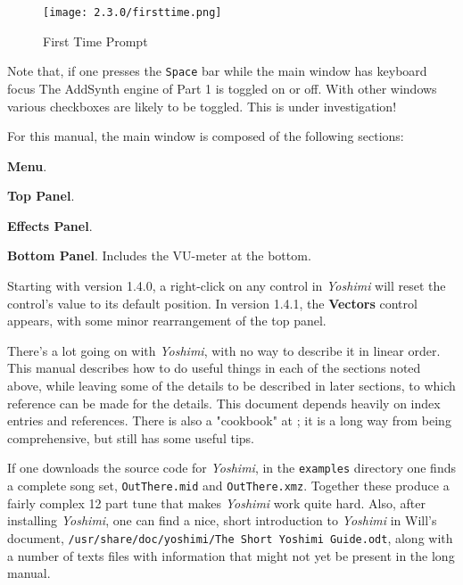 \documentclass[
 11pt,
 twoside,
 a4paper,
 final                                 %
]{article}
\begin{document}
\begin{figure}[H]
   \centering
   \texttt{[image: 2.3.0/firsttime.png]}
   \caption{First Time Prompt}
   \label{fig:first_time_info}
\end{figure}

   Note that, if one presses the \texttt{Space} bar while the main window has
   keyboard focus The AddSynth engine of Part 1 is toggled on or off. With other windows various checkboxes are likely to be toggled. This is under investigation!

   For this manual, the main window is composed of the following sections:

\begin{enumber}
   \item \textbf{Menu}.
   \item \textbf{Top Panel}.
   \item \textbf{Effects Panel}.
   \item \textbf{Bottom Panel}.  Includes the VU-meter at the bottom.
\end{enumber}

   Starting with version 1.4.0, a right-click on any control in \textsl{Yoshimi}
   will reset the control's value to its default position.  In version 1.4.1, the \textbf{Vectors} control appears, with some minor rearrangement of the top panel.

   There's a lot going on with \textsl{Yoshimi}, with no way to describe
   it in linear order.  This manual describes how to do useful things in
   each of the sections noted above, while leaving some of the details to be
   described in later sections, to which reference can be made for the details.
   This document depends heavily on index entries and references.
   There is also a "cookbook" at \cite{book}; it is a long way from being
   comprehensive, but still has some useful tips.

   If one downloads the source code for \textsl{Yoshimi}, in the
   \texttt{examples} directory one finds a complete song set,
   \texttt{OutThere.mid} and \texttt{OutThere.xmz}. Together these produce a
   fairly complex 12 part tune that makes \textsl{Yoshimi} work quite hard.
   Also, after installing \textsl{Yoshimi}, one can find a nice, short
   introduction to \textsl{Yoshimi} in Will's document,
   \texttt{/usr/share/doc/yoshimi/The Short Yoshimi Guide.odt},
   along with a number of texts files with information that might not yet be
   present in the long manual.
\end{document}
